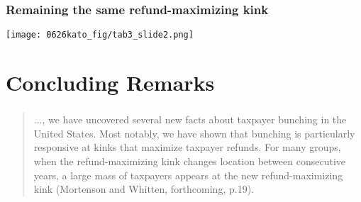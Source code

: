 \documentclass[unicode,12pt]{beamer}
\begin{document}
    \begin{frame}
        \frametitle{Remaining the same refund-maximizing kink}
    
        \centerline{\texttt{[image: 0626kato\_fig/tab3\_slide2.png]}}
    
    \end{frame}

    
    \section{Concluding Remarks}

    \begin{frame}
        \frametitle{}
    
        \begin{quote}
            ..., we have uncovered several new facts about taxpayer bunching in the United States. Most notably, we have shown that bunching is particularly responsive at kinks that maximize taxpayer refunds. For many groups, when the refund-maximizing kink changes location between consecutive years, a large mass of taxpayers appears at the new refund-maximizing kink (Mortenson and Whitten, forthcoming, p.19). 
        \end{quote}
    
    \end{frame}
\end{document}
